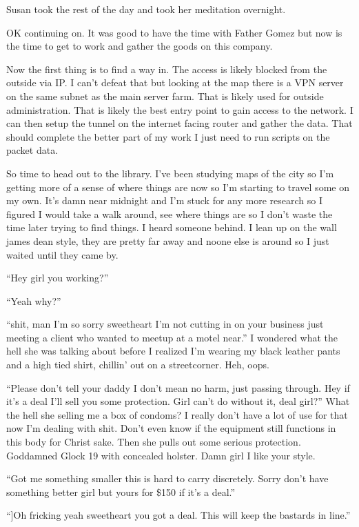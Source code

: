 Susan took the rest of the day and took her meditation overnight. 

OK continuing on. It was good to have the time with Father Gomez but now is the time to get to work and gather the goods on this company.

Now the first thing is to find a way in. The access is likely blocked from the outside via IP. I can't defeat that but looking at the map there is a VPN server on the same subnet as the main server farm. That is likely used for outside administration. That is likely the best entry point to gain access to the network. I can then setup the tunnel on the internet facing router and gather the data. That should complete the better part of my work I just need to run scripts on the packet data.

So time to head out to the library. I've been studying maps of the city so I'm getting more of a sense of where things are now so I'm starting to travel some on my own. It's damn near midnight and I'm stuck for any more research so I figured I would take a walk around, see where things are so I don't waste the time later trying to find things. I heard someone behind. I lean up on the wall james dean style, they are pretty far away and noone else is around so I just waited until they came by.

``Hey girl you working?''

``Yeah why?''

``shit, man I'm so sorry sweetheart I'm not cutting in on your business just meeting a client who wanted to meetup at a motel near.''
I wondered what the hell she was talking about before I realized I'm wearing my black leather pants and a high tied shirt, chillin' out on a streetcorner. Heh, oops.

``Please don't tell your daddy I don't mean no harm, just passing through. Hey if it's a deal I'll sell you some protection. Girl can't do without it, deal girl?''
What the hell she selling me a box of condoms? I really don't have a lot of use for that now I'm dealing with shit. Don't even know if the equipment still functions in this body for Christ sake.
Then she pulls out some serious protection. Goddamned Glock 19 with concealed holster. Damn girl I like your style.

``Got me something smaller this is hard to carry discretely. Sorry don't have something better girl but yours for \$150 if it's a deal.''

``]Oh fricking yeah sweetheart you got a deal. This will keep the bastards in line.''

